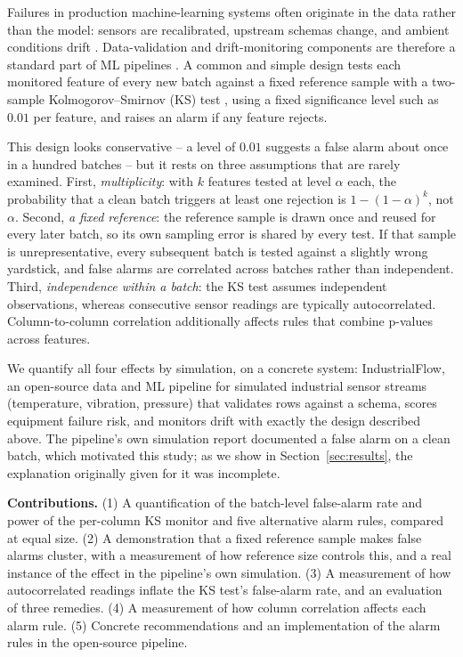 \documentclass[11pt]{article}
\begin{document}
Failures in production machine-learning systems often originate in the data rather than the model: sensors are recalibrated, upstream schemas change, and ambient conditions drift \citep{sculley2015hidden, polyzotis2019validation}. Data-validation and drift-monitoring components are therefore a standard part of ML pipelines \citep{schelter2018deequ, klaise2020monitoring}. A common and simple design tests each monitored feature of every new batch against a fixed reference sample with a two-sample Kolmogorov--Smirnov (KS) test \citep{smirnov1948table, massey1951ks}, using a fixed significance level such as $0.01$ per feature, and raises an alarm if any feature rejects.

This design looks conservative -- a level of $0.01$ suggests a false alarm about once in a hundred batches -- but it rests on three assumptions that are rarely examined. First, \emph{multiplicity}: with $k$ features tested at level $\alpha$ each, the probability that a clean batch triggers at least one rejection is $1-(1-\alpha)^k$, not $\alpha$. Second, \emph{a fixed reference}: the reference sample is drawn once and reused for every later batch, so its own sampling error is shared by every test. If that sample is unrepresentative, every subsequent batch is tested against a slightly wrong yardstick, and false alarms are correlated across batches rather than independent. Third, \emph{independence within a batch}: the KS test assumes independent observations, whereas consecutive sensor readings are typically autocorrelated. Column-to-column correlation additionally affects rules that combine p-values across features.

We quantify all four effects by simulation, on a concrete system: IndustrialFlow, an open-source data and ML pipeline for simulated industrial sensor streams (temperature, vibration, pressure) that validates rows against a schema, scores equipment failure risk, and monitors drift with exactly the design described above. The pipeline's own simulation report documented a false alarm on a clean batch, which motivated this study; as we show in Section~\ref{sec:results}, the explanation originally given for it was incomplete.

\textbf{Contributions.} (1) A quantification of the batch-level false-alarm rate and power of the per-column KS monitor and five alternative alarm rules, compared at equal size. (2) A demonstration that a fixed reference sample makes false alarms cluster, with a measurement of how reference size controls this, and a real instance of the effect in the pipeline's own simulation. (3) A measurement of how autocorrelated readings inflate the KS test's false-alarm rate, and an evaluation of three remedies. (4) A measurement of how column correlation affects each alarm rule. (5) Concrete recommendations and an implementation of the alarm rules in the open-source pipeline.
\end{document}
